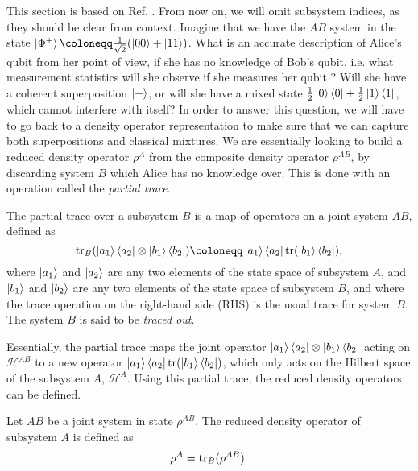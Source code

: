 This section is based on Ref. \cite[pp. 105--109]{nielsen_quantum_2010}. From now on, we will omit subsystem indices, as they should be clear from context. Imagine that we have the $AB$ system in the state $\ket{\Phi^+} \coloneqq \frac{1}{\sqrt{2}}(\ket{00} + \ket{11})$. What is an accurate description of Alice's qubit from her point of view, if she has no knowledge of Bob's qubit, i.e. what measurement statistics will she observe if she measures her qubit ? Will she have a coherent superposition $\ket{+}$, or will she have a mixed state $\frac{1}{2}\ket{0}\bra{0} + \frac{1}{2} \ket{1}\bra{1}$, which cannot interfere with itself?  In order to answer this question, we will have to go back to a density operator representation to make sure that we can capture both superpositions and classical mixtures. We are essentially looking to build a reduced density operator $\rho^A$ from the composite density operator $\rho^{AB}$, by discarding system $B$ which Alice has no knowledge over. This is done with an operation called the \textit{partial trace}.


\begin{definition} %
    The partial trace over a subsystem $B$ is a map of operators on a joint system $AB$, defined as
    \begin{equation}
        \tr_B (\ket{a_1}\bra{a_2} \otimes \ket{b_1}\bra{b_2}) \coloneqq \ket{a_1}\bra{a_2} \tr(\ket{b_1}\bra{b_2}),
    \end{equation}
    where $\ket{a_1}$ and $\ket{a_2}$ are any two elements of the state space of subsystem $A$, and $\ket{b_1}$ and $\ket{b_2}$ are any two elements of the state space of subsystem $B$, and where the trace operation on the right-hand side (RHS) is the usual trace for system $B$. The system $B$ is said to be \textit{traced out}.
\end{definition}

Essentially, the partial trace maps the joint operator $\ket{a_1}\bra{a_2} \otimes \ket{b_1}\bra{b_2}$ acting on $\mathcal{H}^{AB}$ to a new operator $\ket{a_1}\bra{a_2} \operatorname{tr}(\ket{b_1}\bra{b_2})$, which only acts on the Hilbert space of the subsystem $A$, $\mathcal{H}^A$. Using this partial trace, the reduced density operators can be defined.

\begin{definition}
    Let $AB$ be a joint system in state $\rho^{AB}$. The reduced density operator of subsystem $A$ is defined as
    \begin{equation}
        \rho^A = \operatorname{tr}_B(\rho^{AB}).
    \end{equation}
\end{definition}

